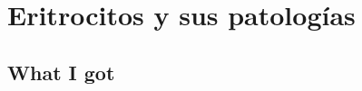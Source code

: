 

\chapter{Eritrocitos y sus patologías}

\section{What I got}
\label{section:results}
				
\Blindtext
